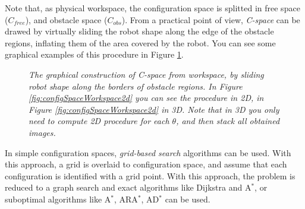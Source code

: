 Note that, as physical workspace, the configuration space is splitted in free space ($C_{free}$), and obstacle space ($C_{obs}$). From a practical point of view, \textit{C-space} can be drawed by virtually sliding the robot shape along the edge of the obstacle regions, inflating them of the area covered by the robot. You can see some graphical examples of this procedure in Figure \ref{fig:configSpaceWorkspace}.

\begin{figure}
	\centering
	\qquad
	\caption{\textit{The graphical construction of C-space from workspace, by sliding robot shape along the borders of obstacle regions. In Figure \ref{fig:configSpaceWorkspace2d} you can see the procedure in 2D, in Figure \ref{fig:configSpaceWorkspace2d} in 3D. Note that in 3D you only need to compute 2D procedure for each $\theta$, and then stack all obtained images.}}
	\label{fig:configSpaceWorkspace}
\end{figure}

In simple configuration spaces, \textit{grid-based search} algorithms can be used. With this approach, a grid is overlaid to configuration space, and assume that each configuration is identified with a grid point. With this approach, the problem is reduced to a graph search and exact algorithms like Dijkstra and A$^*$, or suboptimal algorithms like A$^*$, ARA$^*$, AD$^*$ can be used.

